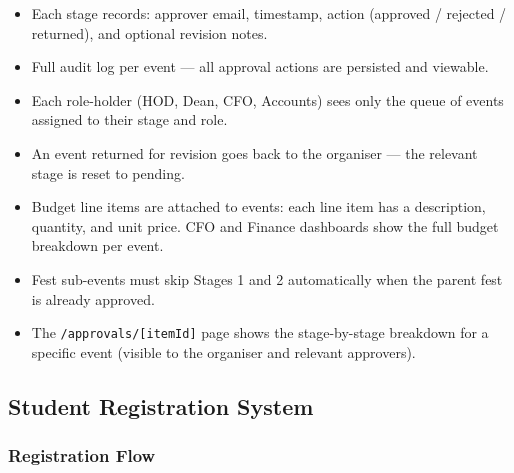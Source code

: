 \documentclass[12pt,a4paper]{article}
\begin{document}
\begin{itemize}[leftmargin=*]
    \item Each stage records: approver email, timestamp, action (approved / rejected / returned), and optional revision notes.
    \item Full audit log per event — all approval actions are persisted and viewable.
    \item Each role-holder (HOD, Dean, CFO, Accounts) sees only the queue of events assigned to their stage and role.
    \item An event returned for revision goes back to the organiser — the relevant stage is reset to pending.
    \item Budget line items are attached to events: each line item has a description, quantity, and unit price. CFO and Finance dashboards show the full budget breakdown per event.
    \item Fest sub-events must skip Stages 1 and 2 automatically when the parent fest is already approved.
    \item The \texttt{/approvals/[itemId]} page shows the stage-by-stage breakdown for a specific event (visible to the organiser and relevant approvers).
\end{itemize}

\subsection{Student Registration System}

\subsubsection{Registration Flow}
\end{document}
